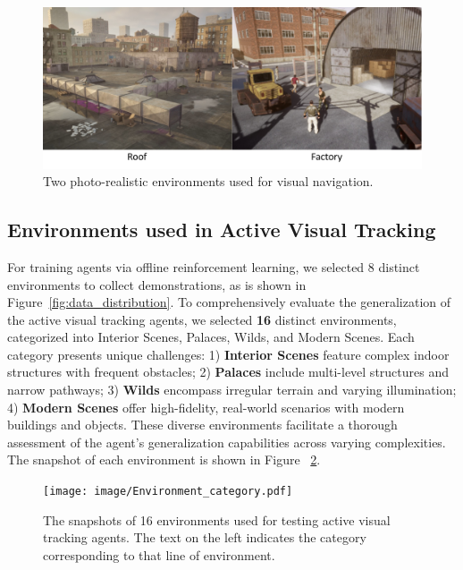 \begin{figure}[t]
    \centering
    \includegraphics[width=0.8\linewidth]{image/Nav_env.pdf}
    \caption{ Two photo-realistic environments used for visual navigation. }
    \label{fig:Nav_env}
\end{figure}


\subsection{Environments used in Active Visual Tracking}
\label{app:env_track}
For training agents via offline reinforcement learning, we selected 8 distinct environments to collect demonstrations, as is shown in Figure~\ref{fig:data_distribution}. 
To comprehensively evaluate the generalization of the active visual tracking agents, we selected \textbf{16} distinct environments, categorized into Interior Scenes, Palaces, Wilds, and Modern Scenes. Each category presents unique challenges: 1) \textbf{Interior Scenes} feature complex indoor structures with frequent obstacles; 2) \textbf{Palaces} include multi-level structures and narrow pathways; 3) \textbf{Wilds} encompass irregular terrain and varying illumination; 4) \textbf{Modern Scenes} offer high-fidelity, real-world scenarios with modern buildings and objects. These diverse environments facilitate a thorough assessment of the agent’s generalization capabilities across varying complexities. The snapshot of each environment is shown in Figure ~\ref{fig:eval_env}.

\begin{figure}[t]
    \centering
    \texttt{[image: image/Environment\_category.pdf]}
    \caption{The snapshots of 16 environments used for testing active visual tracking agents. The text on the left indicates the category corresponding to that line of environment.}
    \label{fig:eval_env}
\end{figure}


